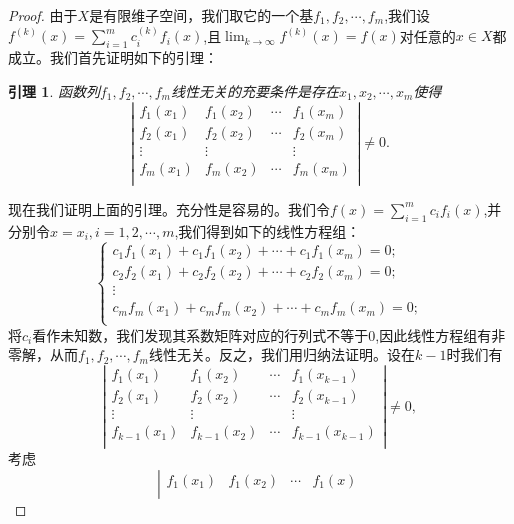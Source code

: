 \documentclass{article}
\newtheorem{lemma}{引理}[subsection]
\begin{document}
\begin{proof}
由于$X$是有限维子空间，我们取它的一个基$f_1,f_2,\cdots,f_m$,我们设$f^{(k)}(x)=\sum_{i=1}^mc_i^{(k)}f_i(x)$,且$\lim_{k\to\infty}f^{(k)}(x)=f(x)$对任意的$x\in X$都成立。我们首先证明如下的引理：
\begin{lemma}
函数列$f_1,f_2,\cdots,f_m$线性无关的充要条件是存在$x_1,x_2,\cdots,x_m$使得
$$
\left| \begin{matrix}
	f_1\left( x_1 \right)&		f_1\left( x_2 \right)&		\cdots&		f_1\left( x_m \right)\\
	f_2\left( x_1 \right)&		f_2\left( x_2 \right)&		\cdots&		f_2\left( x_m \right)\\
	\vdots&		\vdots&		&		\vdots\\
	f_m\left( x_1 \right)&		f_m\left( x_2 \right)&		\cdots&		f_m\left( x_m \right)\\
\end{matrix} \right|\ne 0.
$$
\end{lemma}
现在我们证明上面的引理。充分性是容易的。我们令$f(x)=\sum_{i=1}^mc_if_i(x)$,并分别令$x=x_i,i=1,2,\cdots,m$,我们得到如下的线性方程组：
$$
\begin{cases}
	c_1f_1\left( x_1 \right) +c_1f_1\left( x_2 \right) +\cdots +c_1f_1\left( x_m \right) =0;\\
	c_2f_2\left( x_1 \right) +c_2f_2\left( x_2 \right) +\cdots +c_2f_2\left( x_m \right) =0;\\
	\vdots\\
	c_mf_m\left( x_1 \right) +c_mf_m\left( x_2 \right) +\cdots +c_mf_m\left( x_m \right) =0;\\
\end{cases}
$$
将$c_i$看作未知数，我们发现其系数矩阵对应的行列式不等于$0$,因此线性方程组有非零解，从而$f_1,f_2,\cdots,f_m$线性无关。反之，我们用归纳法证明。设在$k-1$时我们有
$$
\left| \begin{matrix}
	f_1\left( x_1 \right)&		f_1\left( x_2 \right)&		\cdots&		f_1\left( x_{k-1} \right)\\
	f_2\left( x_1 \right)&		f_2\left( x_2 \right)&		\cdots&		f_2\left( x_{k-1} \right)\\
	\vdots&		\vdots&		&		\vdots\\
	f_{k-1}\left( x_1 \right)&		f_{k-1}\left( x_2 \right)&		\cdots&		f_{k-1}\left( x_{k-1} \right)\\
\end{matrix} \right|\ne 0,
$$
考虑
$$
\left| \begin{matrix}
	f_1\left( x_1 \right)&		f_1\left( x_2 \right)&		\cdots&		f_1\left( x \right)\\

\end{matrix}$$
\end{proof}
\end{document}

